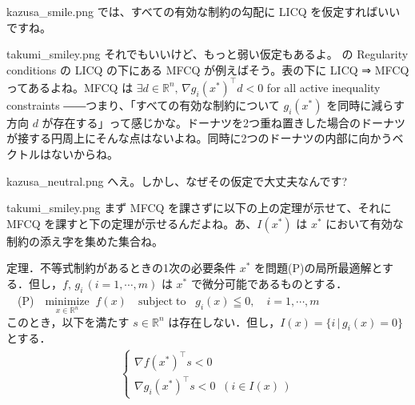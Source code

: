 \documentclass[b5paper,xelatex,ja=standard,10pt]{bxjsarticle}
\begin{document}
\begin{SERIFU}[colback=PaleIris, colbacktitle=PaleIris2]{kazusa_smile.png}
では、すべての有効な制約の勾配に LICQ を仮定すればいいですね。
\end{SERIFU}

\begin{SERIFU}[colback=PaleGold, colbacktitle=PaleGold2]{takumi_smiley.png}
それでもいいけど、もっと弱い仮定もあるよ。\cite{wikipedia_en} の Regularity conditions の LICQ の下にある MFCQ が例えばそう。表の下に LICQ ⇒ MFCQ ってあるよね。MFCQ は $\exists d \in \mathbb{R}^n, \, \nabla g_i(x^\ast) ^\top d < 0$ for all active inequality constraints ――つまり、「すべての有効な制約について $g_i(x^\ast)$ を同時に減らす方向 $d$ が存在する」って感じかな。ドーナツを2つ重ね置きした場合のドーナツが接する円周上にそんな点はないよね。同時に2つのドーナツの内部に向かうベクトルはないからね。
\end{SERIFU}

\begin{SERIFU}[colback=PaleIris, colbacktitle=PaleIris2]{kazusa_neutral.png}
へえ。しかし、なぜその仮定で大丈夫なんです?
\end{SERIFU}

\begin{SERIFU}[colback=PaleGold, colbacktitle=PaleGold2]{takumi_smiley.png}
まず MFCQ を課さずに以下の上の定理が示せて、それに MFCQ を課すと下の定理が示せるんだよね。あ、$I(x^\ast)$ は $x^\ast$ において有効な制約の添え字を集めた集合ね。
\end{SERIFU}

\begin{PROP}[colback=White]{定理．不等式制約があるときの1次の必要条件}
$x^\ast$ を問題(P)の局所最適解とする．但し，$f, \, g_i \, (i = 1, \cdots, m)$ は $x^\ast$ で微分可能であるものとする．
\\[3pt]
　(P)　$\displaystyle \underset{x \in \mathbb{R}^n}{\mathrm{minimize}} \; \; f(x)  \quad  \mathrm{subject \; to}   \; \; \; g_i(x) \leqq 0,  \quad i = 1, \cdots, m $
\\[3pt]
このとき，以下を満たす $s \in \mathbb{R}^n$ は存在しない．但し，$I(x) = \{i \, | \, g_i(x) = 0\}$ とする．
\begin{eqnarray*}
\left\{
\begin{array}{l}
\displaystyle \nabla f (x^\ast) ^\top s < 0  \\[5pt]
\nabla g_i (x^\ast) ^\top s < 0  \; \; (i \in I(x) \, )
\end{array}
\right.
\end{eqnarray*}
\end{PROP}
\end{document}
